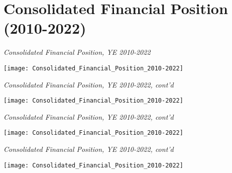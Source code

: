
\chapter{Consolidated Financial Position (2010-2022)}
\label{ch:consolidated_financial_position}
\begin{landscape}
  \vspace{-1.25in}
  \begin{table}[htbp]
    \caption[Consolidated Financial Position, Years Ending 2010–2022]{\textit{Consolidated Financial Position, YE 2010-2022}}%
    \label{tab:consolidated_financial_position}
    \vspace{-0.25in}\hspace{-1.25in}
    \texttt{[image: Consolidated\_Financial\_Position\_2010-2022]} %
  \end{table}
\end{landscape}

\begin{landscape}
  \vspace{-4in}
  \begin{table}[htbp]
    \caption*{\textit{Consolidated Financial Position, YE 2010-2022, cont'd}}
    \vspace{-0.25in}\hspace{-1.25in}
    \texttt{[image: Consolidated\_Financial\_Position\_2010-2022]} %
  \end{table}
\end{landscape}

\begin{landscape}
  \vspace{-2in}
  \begin{table}[htbp]
    \caption*{\textit{Consolidated Financial Position, YE 2010-2022, cont'd}}
    \vspace{-0.25in}\hspace{-1.25in}
    \texttt{[image: Consolidated\_Financial\_Position\_2010-2022]} %
  \end{table}
\end{landscape}

\begin{landscape}
  \vspace{-4in}
  \begin{table}[htbp]
    \caption*{\textit{Consolidated Financial Position, YE 2010-2022, cont'd}}
    \vspace{-0.25in}\hspace{-1.25in}
    \texttt{[image: Consolidated\_Financial\_Position\_2010-2022]} %
  \end{table}
\end{landscape}

